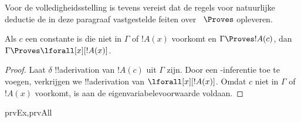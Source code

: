 \documentclass[openany]{memoir}
\begin{document}
\begingroup
\def\olfilename{OLP-0094}
\def\olfilepath{content/first-order-logic/natural-deduction/}
\hypertarget{unit-OLP-0094}{}






\begin{explain}
  Voor de volledigheidsstelling is tevens vereist dat de regels voor
  natuurlijke deductie de in deze paragraaf vastgestelde feiten over
  ~$\Proves$ opleveren.
\end{explain}

\begin{thm}
 Als $c$ een constante is die niet
in $\Gamma$ of $!A(x)$ voorkomt en $\Gamma \Proves !A(c)$, dan $\Gamma
\Proves \lforall[x][!A(x)]$.
\end{thm}

\begin{proof}
Laat $\delta$ !!a{derivation} van $!A(c)$ uit $\Gamma$ zijn. Door een
\Intro{\lforall}-inferentie toe te voegen, verkrijgen we
!!a{derivation} van $\lforall[x][!A(x)]$. Omdat $c$ niet in $\Gamma$
of $!A(x)$ voorkomt, is aan de eigenvariabelevoorwaarde voldaan.
\end{proof}

\begin{prop}
\begin{tagenumerate}{prvEx,prvAll}

\end{tagenumerate}
\end{prop}
\end{document}
